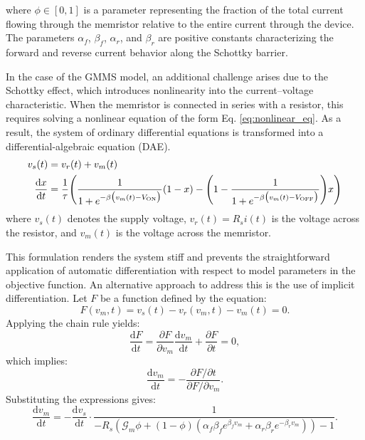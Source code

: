 \documentclass[11pt, oneside]{article}
\newcommand{\G}{\mathcal{G}}
\newcommand{\von}{V_{\rm ON}}
\newcommand{\voff}{V_{\rm OFF}}
\newcommand{\dert}[1]{\frac{{\rm d} {#1}}{{\rm d} t} }
\begin{document}
where $\phi \in [0,1]$ is a parameter representing the fraction of the total current flowing through the memristor relative to the entire current through the device. The parameters $\alpha_f$, $\beta_f$, $\alpha_r$, and $\beta_r$ are positive constants characterizing the forward and reverse current behavior along the Schottky barrier.


In the case of the GMMS model, an additional challenge arises due to the Schottky effect, which introduces nonlinearity into the current–voltage characteristic. When the memristor is connected in series with a resistor, this requires solving a nonlinear equation of the form Eq. \eqref{eq:nonlinear_eq}. As a result, the system of ordinary differential equations is transformed into a differential-algebraic equation (DAE).
\begin{align}
    v_s(t)   & = v_r(t) + v_m(t)                                                                                                                                    \\
    \dert{x} & =  \frac{1}{\tau} \Bigg( \frac{1}{1+e^{-\beta \big(v_m(t)-\von\big)}} (1-x)  -\Bigg(1- \frac{1}{1+e^{-\beta \big(v_m(t)-\voff\big)}} \Bigg) x \Bigg) \\
    \label{eq:nonlinear_eq}
\end{align}
where $v_s(t)$ denotes the supply voltage, $v_r(t) = R_s i(t)$ is the voltage across the resistor, and $v_m(t)$ is the voltage across the memristor.

This formulation renders the system stiff and prevents the straightforward application of automatic differentiation with respect to model parameters in the objective function. An alternative approach to address this is the use of implicit differentiation.
Let $F$ be a function defined by the equation:
\begin{equation}
    F(v_m, t) = v_s(t) - v_r(v_m, t) - v_m(t) = 0.
\end{equation}
Applying the chain rule yields:
\begin{equation}
    \frac{\mathrm{d} F}{\mathrm{d} t} = \frac{\partial F}{\partial v_m} \frac{\mathrm{d} v_m}{\mathrm{d} t} + \frac{\partial F}{\partial t} = 0,
\end{equation}
which implies:
\begin{equation}
    \frac{\mathrm{d} v_m}{\mathrm{d} t} = - \frac{\partial F / \partial t}{\partial F / \partial v_m}.
\end{equation}
Substituting the expressions gives:
\begin{equation}
    \frac{\mathrm{d} v_m}{\mathrm{d} t} = - \frac{\mathrm{d} v_s}{\mathrm{d} t} \cdot \frac{1}{ - R_s \left( \G_{m} \phi + (1 - \phi) \left( \alpha_f \beta_f e^{\beta_f v_m} + \alpha_r \beta_r e^{-\beta_r v_m} \right) \right) - 1 }.
\end{equation}
\end{document}
